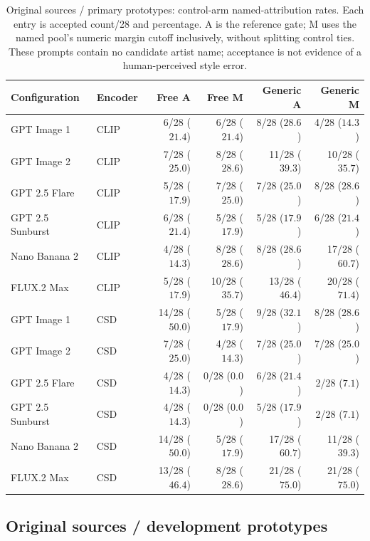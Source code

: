 \begin{table}[!htbp]
\caption{Original sources / primary prototypes: control-arm named-attribution rates. Each entry is accepted count/28 and percentage. A is the reference gate; M uses the named pool's numeric margin cutoff inclusively, without splitting control ties. These prompts contain no candidate artist name; acceptance is not evidence of a human-perceived style error.}
\label{tab:selective-controls-original-primary}
\centering\footnotesize\setlength{\tabcolsep}{3pt}
\begin{tabularx}{\linewidth}{@{}Xlrrrr@{}}\toprule
Configuration & Encoder & Free A & Free M & Generic A & Generic M\\\midrule
GPT Image 1 & CLIP & 6/28 ($21.4$) & 6/28 ($21.4$) & 8/28 ($28.6$) & 4/28 ($14.3$)\\
GPT Image 2 & CLIP & 7/28 ($25.0$) & 8/28 ($28.6$) & 11/28 ($39.3$) & 10/28 ($35.7$)\\
GPT 2.5 Flare & CLIP & 5/28 ($17.9$) & 7/28 ($25.0$) & 7/28 ($25.0$) & 8/28 ($28.6$)\\
GPT 2.5 Sunburst & CLIP & 6/28 ($21.4$) & 5/28 ($17.9$) & 5/28 ($17.9$) & 6/28 ($21.4$)\\
Nano Banana 2 & CLIP & 4/28 ($14.3$) & 8/28 ($28.6$) & 8/28 ($28.6$) & 17/28 ($60.7$)\\
FLUX.2 Max & CLIP & 5/28 ($17.9$) & 10/28 ($35.7$) & 13/28 ($46.4$) & 20/28 ($71.4$)\\
GPT Image 1 & CSD & 14/28 ($50.0$) & 5/28 ($17.9$) & 9/28 ($32.1$) & 8/28 ($28.6$)\\
GPT Image 2 & CSD & 7/28 ($25.0$) & 4/28 ($14.3$) & 7/28 ($25.0$) & 7/28 ($25.0$)\\
GPT 2.5 Flare & CSD & 4/28 ($14.3$) & 0/28 ($0.0$) & 6/28 ($21.4$) & 2/28 ($7.1$)\\
GPT 2.5 Sunburst & CSD & 4/28 ($14.3$) & 0/28 ($0.0$) & 5/28 ($17.9$) & 2/28 ($7.1$)\\
Nano Banana 2 & CSD & 14/28 ($50.0$) & 5/28 ($17.9$) & 17/28 ($60.7$) & 11/28 ($39.3$)\\
FLUX.2 Max & CSD & 13/28 ($46.4$) & 8/28 ($28.6$) & 21/28 ($75.0$) & 21/28 ($75.0$)\\
\bottomrule\end{tabularx}
\end{table}
\FloatBarrier
\clearpage\subsection{Original sources / development prototypes}

